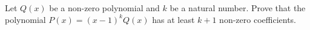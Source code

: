Let $Q(x)$ be a non-zero polynomial and $k$ be a natural number. Prove that the polynomial $P(x) = (x-1)^kQ(x)$ has at least $k+1$ non-zero coefficients.